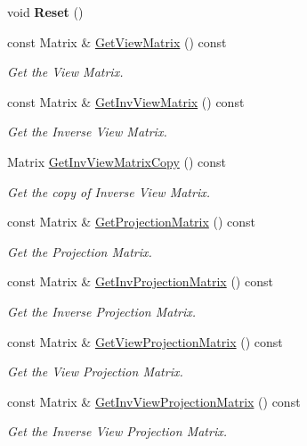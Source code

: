 \begin{DoxyCompactItemize}
void {\bfseries Reset} ()
\item 
const Matrix \& \hyperlink{classCamera_ae56a0f8c9aa2d4eead91fe342159b1e5}{Get\+View\+Matrix} () const
\begin{DoxyCompactList}\small\item\em Get the View Matrix. \end{DoxyCompactList}\item 
const Matrix \& \hyperlink{classCamera_a7af480f3ec57bf981cd00b202aa0ff13}{Get\+Inv\+View\+Matrix} () const
\begin{DoxyCompactList}\small\item\em Get the Inverse View Matrix. \end{DoxyCompactList}\item 
Matrix \hyperlink{classCamera_ad9cd52470afe2f8a0e7a651f4592ee3c}{Get\+Inv\+View\+Matrix\+Copy} () const
\begin{DoxyCompactList}\small\item\em Get the copy of Inverse View Matrix. \end{DoxyCompactList}\item 
const Matrix \& \hyperlink{classCamera_a51e9a67637aeb424e1e173eae22d23c1}{Get\+Projection\+Matrix} () const
\begin{DoxyCompactList}\small\item\em Get the Projection Matrix. \end{DoxyCompactList}\item 
const Matrix \& \hyperlink{classCamera_a8c4b6ade261f29d41517bd1674404ccc}{Get\+Inv\+Projection\+Matrix} () const
\begin{DoxyCompactList}\small\item\em Get the Inverse Projection Matrix. \end{DoxyCompactList}\item 
const Matrix \& \hyperlink{classCamera_a2b52161705059c0f182d4d0b62808211}{Get\+View\+Projection\+Matrix} () const
\begin{DoxyCompactList}\small\item\em Get the View Projection Matrix. \end{DoxyCompactList}\item 
const Matrix \& \hyperlink{classCamera_a00cfc3d1d31e179df4d02b3878da75bd}{Get\+Inv\+View\+Projection\+Matrix} () const
\begin{DoxyCompactList}\small\item\em Get the Inverse View Projection Matrix. \end{DoxyCompactList}\item 

\end{DoxyCompactItemize}

